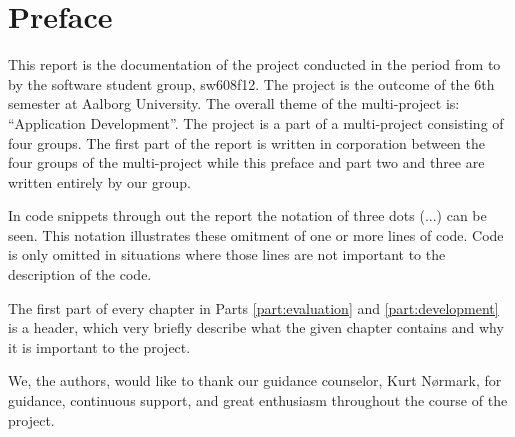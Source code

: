 \chapter*{Preface}
\label{chap:preface}
This report is the documentation of the project conducted in the period from  to  by the software student group, sw608f12.
The project is the outcome of the 6th semester at Aalborg University. 
The overall theme of the multi-project is: ``Application Development''. 
The project is a part of a multi-project consisting of four groups. 
The first part of the report is written in corporation between the four groups of the multi-project while this preface and part two and three are written entirely by our group. 

In code snippets through out the report the notation of three dots (...)  can be seen.
This notation illustrates these omitment of one or more lines of code. 
Code is only omitted in situations where those lines are not important to the description of the code. 

The first part of every chapter in Parts \ref{part:evaluation} and \ref{part:development} is a header, which very briefly describe what the given chapter contains and why it is important to the project.


We, the authors, would like to thank our guidance counselor, Kurt N\o{}rmark, for guidance, continuous support, and great enthusiasm throughout the course of the project.
